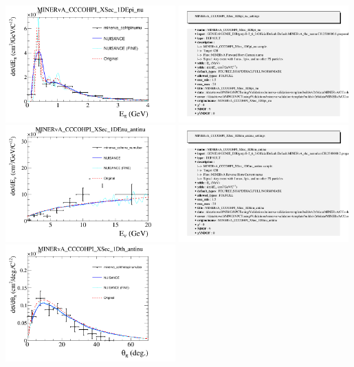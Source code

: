 \documentclass{article}
\begin{document}
\centering
\includegraphics[width=0.49\textwidth]{figures/minerva_cohtpinumu_comp.png}
\includegraphics[width=0.49\textwidth]{figures/minerva_cohtpinumu_info.png}
\centering
\includegraphics[width=0.49\textwidth]{figures/minerva_cohenu_numubar_comp.png}
\includegraphics[width=0.49\textwidth]{figures/minerva_cohenu_numubar_info.png}
\centering
\includegraphics[width=0.49\textwidth]{figures/minerva_cohthetapinumubar_comp.png}
\end{document}
